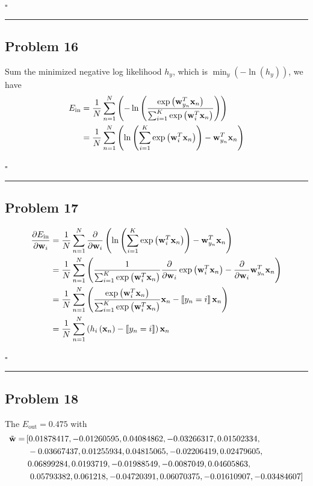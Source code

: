 \documentclass[12pt]{article}
\newcommand*{\QEDB}{\hfill\ensuremath{\square}}
\newcommand{\ParTh}[1]{\left(#1\right)}
\newcommand{\BF}[1]{{\bf#1}}
\newcommand{\horrule}[1]{\rule{\linewidth}{#1}}
\begin{document}
\QEDB

\horrule{0.5pt}

\subsection*{Problem 16}

Sum the minimized negative log likelihood $h_y$, which is $\min_y\ParTh{-\ln\ParTh{h_y}}$, we have
\begin{align}
E_{\text{in}}&=\dfrac{1}{N}\sum_{n=1}^{N}\ParTh{-\ln\ParTh{\dfrac{\exp\ParTh{\BF{w}^T_{y_n}\BF{x}_n}}{\sum_{i=1}^{K}\exp\ParTh{\BF{w}^T_i\BF{x}_n}}}}\\
&=\dfrac{1}{N}\sum_{n=1}^{N}\ParTh{\ln\ParTh{\sum_{i=1}^{K}\exp\ParTh{\BF{w}^T_i\BF{x}_n}}-\BF{w}^T_{y_n}\BF{x}_n}
\end{align}

\QEDB

\horrule{0.5pt}

\subsection*{Problem 17}

\begin{align}
\dfrac{\partial E_{\text{in}}}{\partial \BF{w}_i}&=\dfrac{1}{N}\sum_{n=1}^{N}\dfrac{\partial}{\partial \BF{w}_i}\ParTh{\ln\ParTh{\sum_{i=1}^{K}\exp\ParTh{\BF{w}^T_i\BF{x}_n}}-\BF{w}^T_{y_n}\BF{x}_n}\\
&=\dfrac{1}{N}\sum_{n=1}^{N}\ParTh{\dfrac{1}{\sum_{i=1}^{K}\exp\ParTh{\BF{w}^T_i\BF{x}_n}}\dfrac{\partial}{\partial \BF{w}_i}\exp\ParTh{\BF{w}^T_i\BF{x}_n}-\dfrac{\partial}{\partial \BF{w}_i}\BF{w}^T_{y_n}\BF{x}_n}\\
&=\dfrac{1}{N}\sum_{n=1}^{N}\ParTh{\dfrac{\exp\ParTh{\BF{w}^T_i\BF{x}_n}}{\sum_{i=1}^{K}\exp\ParTh{\BF{w}^T_i\BF{x}_n}}\BF{x}_n-\left\llbracket y_n=i\right\rrbracket\BF{x}_n}\\
&=\dfrac{1}{N}\sum_{n=1}^{N}\ParTh{h_i\ParTh{\BF{x}_n}-\left\llbracket y_n=i\right\rrbracket}\BF{x}_n
\end{align}

\QEDB

\horrule{0.5pt}

\subsection*{Problem 18}

The $E_{\text{out}}=0.475$ with
\begin{align}
\tilde{\BF{w}}=&\left[0.01878417, -0.01260595,  0.04084862, -0.03266317,  0.01502334,\right.\\
\nonumber
&~-0.03667437,0.01255934,  0.04815065, -0.02206419,  0.02479605,\\
\nonumber
&~0.06899284,  0.0193719,
-0.01988549, -0.0087049,   0.04605863,\\
\nonumber
&~\left.0.05793382,  0.061218,   -0.04720391,
0.06070375, -0.01610907, -0.03484607\right]
\end{align}
\end{document}
